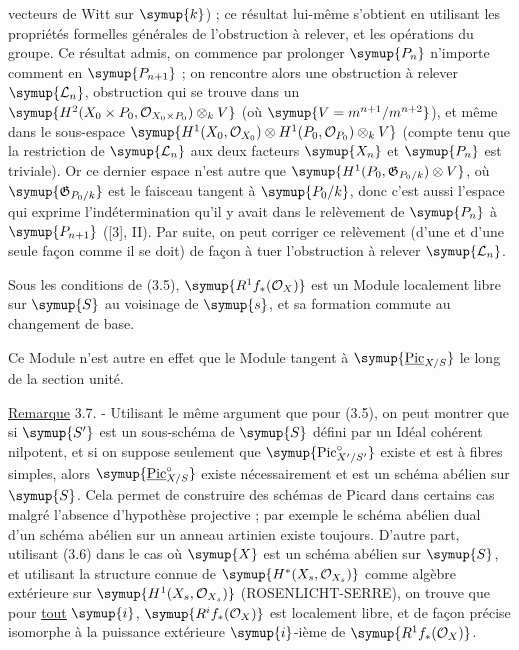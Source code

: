 vecteurs de Witt sur $\symup{k}$) ; ce résultat lui-même s'obtient en utilisant les
propriétés formelles générales de l'obstruction à relever, et les opérations du
groupe. Ce résultat admis, on commence par prolonger $\symup{P_n}$ n'importe comment en
$\symup{P_{n+1}}$ ; on rencontre alors une obstruction à relever $\symup{\mathcal L_n}$,
obstruction qui se trouve dans un $\symup{H^2(X_0\times P_0,\mathcal O_{X_0\times P_0})\otimes_k V}$
(où $\symup{V=m^{n+1}/m^{n+2}}$), et même dans le sous-espace
$\symup{H^1(X_0,\mathcal O_{X_0})\otimes H^1(P_0,\mathcal O_{P_0})\otimes_k V}$
(compte tenu que la restriction de $\symup{\mathcal L_n}$ aux deux facteurs $\symup{X_n}$ et
$\symup{P_n}$ est triviale). Or ce dernier espace n'est autre que $\symup{H^1(P_0,\mathfrak G_{P_0/k})\otimes V}$, où $\symup{\mathfrak G_{P_0/k}}$ est le faisceau tangent à $\symup{P_0/k}$, donc c'est aussi
l'espace qui exprime l'indétermination qu'il y avait dans le relèvement de
$\symup{P_n}$ à $\symup{P_{n+1}}$ ([3], II). Par suite, on peut corriger ce relèvement (d'une
et d'une seule façon comme il se doit) de façon à tuer l'obstruction à relever
$\symup{\mathcal L_n}$.

 Sous les conditions de (3.5),
$\symup{R^1f_*(\mathcal O_X)}$ est un Module localement libre sur $\symup{S}$ au voisinage de
$\symup{s}$, et sa formation commute au changement de base.

Ce Module n'est autre en effet que le Module tangent à
$\symup{\underline{\operatorname{Pic}}_{X/S}}$ le long de la section unité.

\noindent\uline{Remarque} 3.7. - Utilisant le même argument que pour (3.5), on peut
montrer que si $\symup{S'}$ est un sous-schéma de $\symup{S}$ défini par un Idéal cohérent
nilpotent, et si on suppose seulement que
$\symup{\operatorname{Pic}_{X'/S'}^\circ}$ existe et est à fibres simples, alors
$\symup{\underline{\operatorname{Pic}}_{X/S}^\circ}$ existe nécessairement et est un schéma
abélien sur $\symup{S}$. Cela permet de construire des schémas de Picard dans certains
cas malgré l'absence d'hypothèse projective ; par exemple le schéma abélien
dual d'un schéma abélien sur un anneau artinien existe toujours. D'autre part,
utilisant (3.6) dans le cas où $\symup{X}$ est un schéma abélien sur $\symup{S}$, et utilisant
la structure connue de $\symup{H^*(X_s,\mathcal O_{X_s})}$ comme algèbre extérieure
sur $\symup{H^1(X_s,\mathcal O_{X_s})}$ (ROSENLICHT-SERRE), on trouve que pour \uline{tout}
$\symup{i}$, $\symup{R^if_*(\mathcal O_X)}$ est localement libre, et de façon précise isomorphe
à la puissance extérieure $\symup{i}$-ième de $\symup{R^1f_*(\mathcal O_X)}$.


